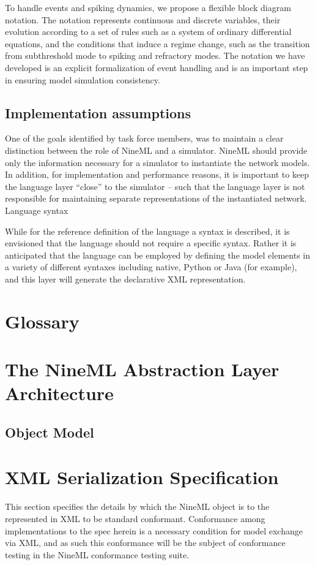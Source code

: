 \documentclass[a4paper]{article}
\begin{document}
To handle events and spiking dynamics, we propose a flexible block
diagram notation. The notation represents continuous and discrete
variables, their evolution according to a set of rules such as a
system of ordinary differential equations, and the conditions that
induce a regime change, such as the transition from subthreshold mode
to spiking and refractory modes. The notation we have developed is an
explicit formalization of event handling and is an important step in
ensuring model simulation consistency.

 
\subsection{Implementation assumptions}

One of the goals identified by task force members, was to maintain a
clear distinction between the role of NineML and a simulator. NineML
should provide only the information necessary for a simulator to
instantiate the network models. In addition, for implementation and
performance reasons, it is important to keep the language layer
“close” to the simulator – such that the language layer is not
responsible for maintaining separate representations of the
instantiated network.  Language syntax

While for the reference definition of the language a syntax is
described, it is envisioned that the language should not require a
specific syntax. Rather it is anticipated that the language can be
employed by defining the model elements in a variety of different
syntaxes including native, Python or Java (for example), and this
layer will generate the declarative XML representation.

\section{Glossary} 

\section{The NineML Abstraction Layer Architecture}

\subsection{Object Model}


\section{XML Serialization Specification}
This section specifies the details by which the NineML object is to
the represented in XML to be standard conformant.  Conformance among
implementations to the spec herein is a necessary condition for model
exchange via XML, and as such this conformance will be the subject of
conformance testing in the NineML conformance testing suite.
 
\end{document}
